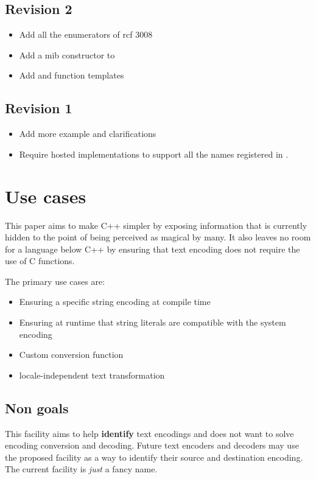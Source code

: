 \documentclass{wg21}
\begin{document}
\subsection*{Revision 2}
\begin{itemize}
	\item Add all the enumerators of rcf 3008
    \item Add a mib constructor to 
    \item Add  and  function templates
\end{itemize}

\subsection*{Revision 1}
\begin{itemize}
    \item Add more example and clarifications
    \item Require hosted implementations to support all the names registered in \cite{rfc3808}.
\end{itemize}

\section{Use cases}

This paper aims to make C++ simpler by exposing information that is currently hidden to the point of
being perceived as magical by many.
It also leaves no room for a language below C++ by ensuring that text encoding does not require the use of C functions.

The primary use cases are:

\begin{itemize}
    \item Ensuring a specific string encoding at compile time
    \item Ensuring at runtime that string literals are compatible with the system encoding
    \item Custom conversion function
    \item locale-independent text transformation
\end{itemize}

\subsection{Non goals}

This facility aims to help \textbf{identify} text encodings and does not want to solve encoding conversion and decoding.
Future text encoders and decoders may use the proposed facility as a way to identify their source and destination encoding.
The current facility is \emph{just} a fancy name.
\end{document}
